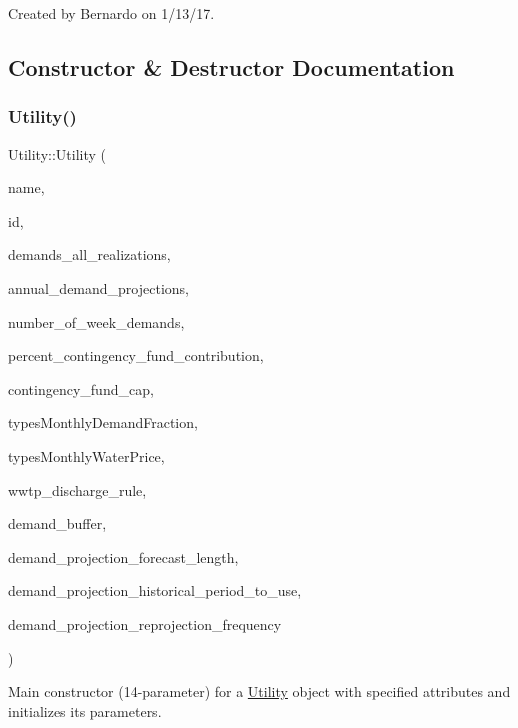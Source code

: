 Created by Bernardo on 1/13/17. 

\subsection{Constructor \& Destructor Documentation}
\mbox{\label{classUtility_a53fb19e5a344de5892c5cfbcc1225da9}} 
\subsubsection{\texorpdfstring{Utility()}{Utility()}\hspace{0.1cm}{\footnotesize\ttfamily [1/5]}}
{\footnotesize\ttfamily Utility\+::\+Utility (\begin{DoxyParamCaption}\item[{const char $\ast$}]{name,  }\item[{int}]{id,  }\item[{vector$<$ vector$<$ double $>$$>$ \&}]{demands\+\_\+all\+\_\+realizations,  }\item[{vector$<$ double $>$ \&}]{annual\+\_\+demand\+\_\+projections,  }\item[{int}]{number\+\_\+of\+\_\+week\+\_\+demands,  }\item[{const double}]{percent\+\_\+contingency\+\_\+fund\+\_\+contribution,  }\item[{const double}]{contingency\+\_\+fund\+\_\+cap,  }\item[{const vector$<$ vector$<$ double $>$$>$ \&}]{types\+Monthly\+Demand\+Fraction,  }\item[{const vector$<$ vector$<$ double $>$$>$ \&}]{types\+Monthly\+Water\+Price,  }\item[{\mbox{\hyperlink{classWwtpDischargeRule}{Wwtp\+Discharge\+Rule}}}]{wwtp\+\_\+discharge\+\_\+rule,  }\item[{double}]{demand\+\_\+buffer,  }\item[{int}]{demand\+\_\+projection\+\_\+forecast\+\_\+length,  }\item[{int}]{demand\+\_\+projection\+\_\+historical\+\_\+period\+\_\+to\+\_\+use,  }\item[{int}]{demand\+\_\+projection\+\_\+reprojection\+\_\+frequency }\end{DoxyParamCaption})}



Main constructor (14-\/parameter) for a \mbox{\hyperlink{classUtility}{Utility}} object with specified attributes and initializes its parameters. 

